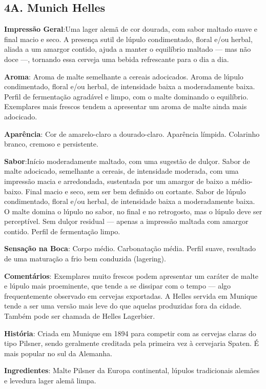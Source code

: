 \subsection*{4A. Munich Helles}

\textbf{Impressão Geral}:Uma lager alemã de cor dourada, com sabor maltado suave e final macio e seco. A presença sutil de lúpulo condimentado, floral e/ou herbal, aliada a um amargor contido, ajuda a manter o equilíbrio maltado — mas não doce —, tornando essa cerveja uma bebida refrescante para o dia a dia.

\textbf{Aroma}: Aroma de malte semelhante a cereais adocicados. Aroma de lúpulo condimentado, floral e/ou herbal, de intensidade baixa a moderadamente baixa. Perfil de fermentação agradável e limpo, com o malte dominando o equilíbrio. Exemplares mais frescos tendem a apresentar um aroma de malte ainda mais adocicado.

\textbf{Aparência}: Cor de amarelo-claro a dourado-claro. Aparência límpida. Colarinho branco, cremoso e persistente.

\textbf{Sabor}:Início moderadamente maltado, com uma sugestão de dulçor. Sabor de malte adocicado, semelhante a cereais, de intensidade moderada, com uma impressão macia e arredondada, sustentada por um amargor de baixo a médio-baixo. Final macio e seco, sem ser bem definido ou cortante. Sabor de lúpulo condimentado, floral e/ou herbal, de intensidade baixa a moderadamente baixa. O malte domina o lúpulo no sabor, no final e no retrogosto, mas o lúpulo deve ser perceptível. Sem dulçor residual — apenas a impressão maltada com amargor contido. Perfil de fermentação limpo.

\textbf{Sensação na Boca}: Corpo médio. Carbonatação média. Perfil suave, resultado de uma maturação a frio bem conduzida (lagering).

\textbf{Comentários}: Exemplares muito frescos podem apresentar um caráter de malte e lúpulo mais proeminente, que tende a se dissipar com o tempo — algo frequentemente observado em cervejas exportadas. A Helles servida em Munique tende a ser uma versão mais leve do que aquelas produzidas fora da cidade. Também pode ser chamada de Helles Lagerbier.

\textbf{História}: Criada em Munique em 1894 para competir com as cervejas claras do tipo Pilsner, sendo geralmente creditada pela primeira vez à cervejaria Spaten. É mais popular no sul da Alemanha.

\textbf{Ingredientes}: Malte Pilsner da Europa continental, lúpulos tradicionais alemães e levedura lager alemã limpa.

